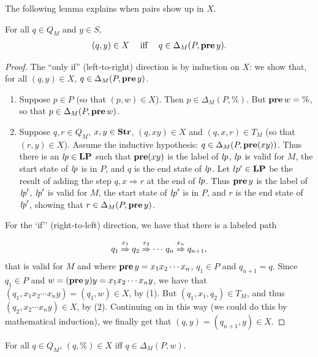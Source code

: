 The following lemma explains when pairs show up in $X$.

\begin{lemma}
\label{AcceptLem1}
For all $q\in Q_M$ and $y\in S$,
\begin{gather*}
(q,y)\in X\quad\;\allowbreak\mbox{iff}\allowbreak\;\quad q\in\Delta_M(P,\mathbf{pre}\,y) .
\end{gather*}
\end{lemma}

\begin{proof}
The ``only if'' (left-to-right) direction is by induction on $X$:
we show that, for all $(q,y)\in X$, $q\in\Delta_M(P,\mathbf{pre}\,y)$.
\begin{enumerate}[(1)]
\item Suppose $p\in P$ (so that $(p,w)\in X$).  Then
  $p\in\Delta_M(P,\%)$.  But $\mathbf{pre}\,w=\%$, so that
  $p\in\Delta_M(P,\mathbf{pre}\,w)$.

\item Suppose $q,r\in Q_M$, $x,y\in\mathbf{Str}$, $(q,xy)\in X$ and
  $(q,x,r)\in T_M$ (so that $(r, y)\in X$).  Assume the inductive hypothesis:
  $q\in\Delta_M(P,\mathbf{pre}(xy))$.  Thus there is an ${\it lp}\in\mathbf{LP}$ such that
  $\mathbf{pre}(xy)$ is the label of ${\it lp}$, ${\it lp}$ is valid for $M$, the start
  state of ${\it lp}$ is in $P$, and $q$ is the end state of ${\it lp}$.  Let
  $lp'\in\mathbf{LP}$ be the result of adding the step $q,x\Rightarrow r$ at
  the end of ${\it lp}$.  Thus $\mathbf{pre}\,y$ is the label of ${\it lp}'$, ${\it lp}'$ is
  valid for $M$, the start state of ${\it lp}'$ is in $P$, and $r$ is the
  end state of ${\it lp}'$, showing that $r\in\Delta_M(P,\mathbf{pre}\,y)$.
\end{enumerate}

For the `if'' (right-to-left) direction, we have that there is a
labeled path
\begin{gather*}
q_1\stackrel{\strut x_1}{\Rightarrow}q_2\stackrel{\strut x_2}{\Rightarrow}\cdots\,q_{n}\stackrel{\strut x_{n}}{\Rightarrow}q_{n+1} ,
\end{gather*}
that is valid for $M$ and where $\mathbf{pre}\,y=x_1x_2\cdots x_n$,
$q_1\in P$ and $q_{n+1}=q$.  Since $q_1\in P$ and
$w=(\mathbf{pre}\,y)y=x_1x_2\cdots x_ny$, we have that
$(q_1, x_1x_2\cdots x_ny)=(q_1,w)\in X$, by (1).  But
$(q_1,x_1,q_2)\in T_M$, and thus $(q_2, x_2\cdots x_ny)\in X$,
by (2). Continuing on in this way (we could do this by mathematical
induction), we finally get that $(q,y)=(q_{n+1},y)\in X$.
\end{proof}

\begin{lemma}
\label{AcceptLem2}
For all $q\in Q_M$, $(q,\%)\in X$ iff $q\in\Delta_M(P,w)$.
\end{lemma}

